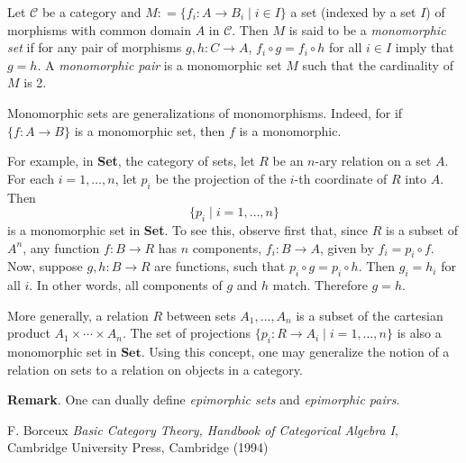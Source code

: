 \documentclass[12pt]{article}
\begin{document}
Let $\mathcal{C}$ be a category and $M: = \lbrace f_i: A \to B_i \mid i\in I\rbrace$ a set (indexed by a set $I$) of morphisms with common domain $A$ in $\mathcal{C}$.  Then $M$ is said to be a \emph{monomorphic set} if for any pair of morphisms $g,h: C\to A$, $f_i\circ g = f_i\circ h$ for all $i\in I$ imply that $g=h$.  A \emph{monomorphic pair} is a monomorphic set $M$ such that the cardinality of $M$ is 2.

Monomorphic sets are generalizations of monomorphisms.  Indeed, for if $\lbrace f:A\to B\rbrace$ is a monomorphic set, then $f$ is a monomorphic.

For example, in \textbf{Set}, the category of sets, let $R$ be an $n$-ary relation on a set $A$.  For each $i=1,\ldots, n$, let $p_i$ be the projection of the $i$-th coordinate of $R$ into $A$.  Then $$\lbrace p_i\mid i=1,\ldots, n\rbrace$$ is a monomorphic set in \textbf{Set}.  To see this, observe first that, since $R$ is a subset of $A^n$, any function $f:B\to R$ has $n$ components, $f_i: B\to A$, given by $f_i = p_i\circ f$.  Now, suppose $g,h:B\to R$ are functions, such that $p_i\circ g=p_i\circ h$.  Then $g_i=h_i$ for all $i$.  In other words, all components of $g$ and $h$ match.  Therefore $g=h$.

More generally, a relation $R$ between sets $A_1,\ldots, A_n$ is a subset of the cartesian product $A_1\times \cdots \times A_n$.  The set of projections $\lbrace p_i: R\to A_i\mid i=1,\ldots,n\rbrace$ is also a monomorphic set in $\textbf{Set}$.  Using this concept, one may generalize the notion of a relation on sets to a relation on objects in a category.

\textbf{Remark}.  One can dually define \emph{epimorphic sets} and \emph{epimorphic pairs}.

\begin{thebibliography}{9}
 F. Borceux \emph{Basic Category Theory, Handbook of Categorical Algebra I}, Cambridge University Press, Cambridge (1994)
\end{thebibliography}
\end{document}
